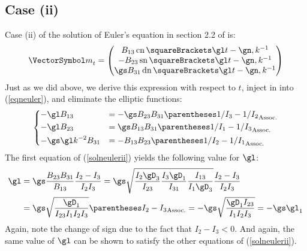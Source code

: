 \documentclass[10pt, a4paper, twoside]{basestyle}
\begin{document}
\subsection*{Case (ii)}
Case (ii) of the solution of Euler's equation in section 2.2 of \cite{Celledoni2007} is:
\[
{\vm}_t =
\begin{pmatrix}
B_{13} \JacobiCN\of{\gl t - \gn, k^{-1}} \\
-B_{23} \JacobiSN\of{\gl t - \gn, k^{-1}} \\
\gs B_{31} \JacobiDN\of{\gl t - \gn, k^{-1}}
\end{pmatrix}
\]
Just as we did above, we derive this expression with respect to $t$, inject in into (\ref{eqneuler}), and eliminate the elliptic functions:
\begin{equation}
\begin{dcases}
-\gl B_{13} &= -\gs B_{23} B_{31} \pa{1/I_3 - 1/I_2} \\
-\gl B_{23} &= \gs B_{13} B_{31} \pa{1/I_1 - 1/I_3} \\
-\gs \gl k^{-2} B_{31} &= -B_{13} B_{23} \pa{1/I_2 - 1/I_1}
\end{dcases}
\label{solneulerii}
\end{equation}
The first equation of (\ref{solneulerii}) yields the following value for $\gl$:
\begin{align*}
\gl &= \gs \frac{B_{23} B_{31}}{B_{13}} \frac{I_2 - I_3}{I_2 I_3}
= \gs\sqrt{\frac{I_2 \gD_3}{I_{23}} \frac{I_3 \gD_1}{I_{31}} \frac{I_{13}}{I_1 \gD_3}} \frac{I_2 - I_3}{I_2 I_3} \\
&= \gs\sqrt{\frac{\gD_1}{I_{23} I_1 I_2 I_3}} \pa{I_2 - I_3}
= -\gs\sqrt{\frac{\gD_1 I_{23}}{I_1 I_2 I_3}}
= -\gs \gl_1
\end{align*}
Again, note the change of sign due to the fact that $I_2 - I_3 < 0$.  And again, the same value of $\gl$ can be shown to satisfy the other
equations of (\ref{solneulerii}).
\end{document}
